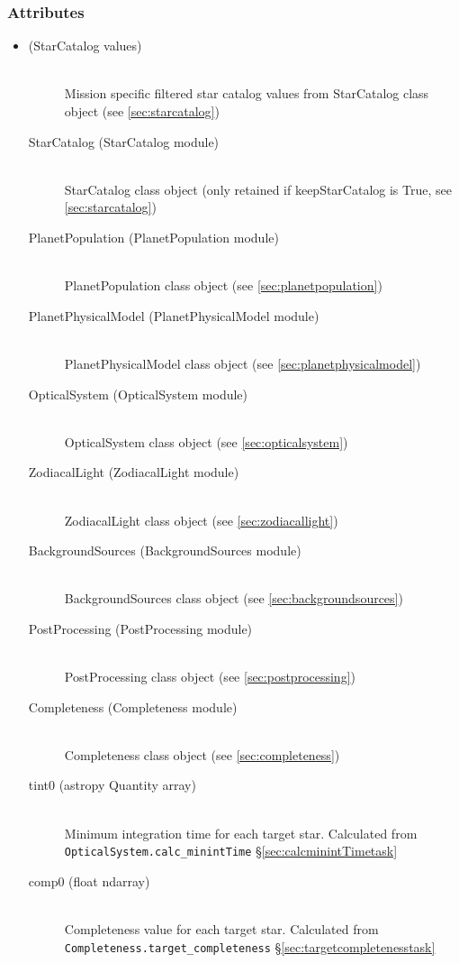 \documentclass[cleanfoot]{asme2ej}
\begin{document}
\subsubsection*{Attributes}
\begin{itemize}
\item 
\begin{description}
    \item[(StarCatalog values)] \hfill \\ Mission specific filtered star catalog values from StarCatalog class object (see \ref{sec:starcatalog})
    \item[StarCatalog (StarCatalog module)]\hfill \\ StarCatalog class object (only retained if keepStarCatalog is True, see \ref{sec:starcatalog})
    \item[PlanetPopulation (PlanetPopulation module)] \hfill \\ PlanetPopulation class object (see \ref{sec:planetpopulation})
    \item[PlanetPhysicalModel (PlanetPhysicalModel module)] \hfill \\ PlanetPhysicalModel class object (see \ref{sec:planetphysicalmodel})
    \item[OpticalSystem (OpticalSystem module)] \hfill \\ OpticalSystem class object (see \ref{sec:opticalsystem})
    \item[ZodiacalLight (ZodiacalLight module)] \hfill \\ ZodiacalLight class object (see \ref{sec:zodiacallight})
    \item[BackgroundSources (BackgroundSources module)] \hfill \\ BackgroundSources class object (see \ref{sec:backgroundsources})
    \item[PostProcessing (PostProcessing module)] \hfill \\ PostProcessing class object (see \ref{sec:postprocessing})
    \item[Completeness (Completeness module)] \hfill \\ Completeness class object (see \ref{sec:completeness})
    \item[tint0 (astropy Quantity array)] \hfill \\ Minimum integration time for each target star. Calculated from \verb+OpticalSystem.calc_minintTime+ \S\ref{sec:calcminintTimetask}
    \item[comp0 (float ndarray)] \hfill \\ Completeness value for each target star. Calculated from \verb+Completeness.target_completeness+ \S\ref{sec:targetcompletenesstask}

\end{description}
\end{itemize}
\end{document}
